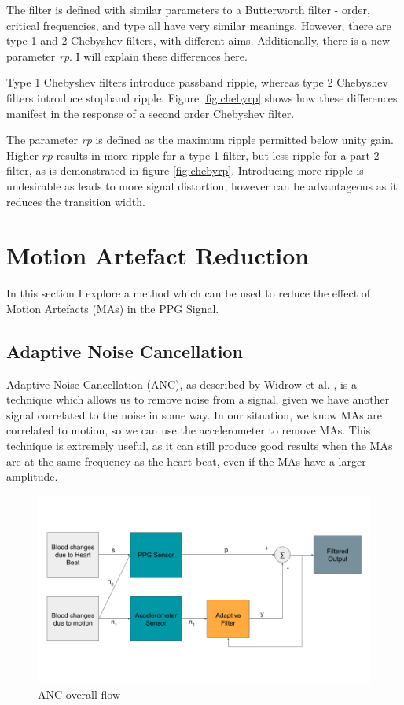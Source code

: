 \documentclass[12pt,a4paper,twoside,openright]{report}
\begin{document}
The filter is defined with similar parameters to a Butterworth filter - order,
critical frequencies, and type all have very similar meanings. However,
there are type 1 and 2 Chebyshev filters, with different aims. Additionally,
there is a new parameter \emph{rp}. I will explain these differences here.

Type 1 Chebyshev filters introduce passband ripple, whereas type 2 Chebyshev 
filters introduce stopband ripple. Figure \ref{fig:chebyrp} shows how these
differences manifest in the response of a second order Chebyshev filter.

The parameter \emph{rp} is defined as the maximum ripple permitted below unity
gain. Higher \(rp\) results in more ripple for a type 1 filter, but less
ripple for a part 2 filter, as is demonstrated in figure \ref{fig:chebyrp}.
Introducing more ripple is undesirable as leads to more signal distortion,
however can be advantageous as it reduces the transition width.

\section{Motion Artefact Reduction}

In this section I explore a method which can be used to reduce the effect of 
Motion Artefacts (MAs) in the PPG Signal.

\subsection{Adaptive Noise Cancellation}

Adaptive Noise Cancellation (ANC), as described by Widrow et al.
\cite{Widrow75}, is a technique which allows us to remove noise from a signal,
given we have another signal correlated to the noise in some way. In our 
situation, we know MAs are correlated to motion, so we can use the 
accelerometer to remove MAs. This technique is extremely useful, as it can 
still produce good results when the MAs are at the same frequency as the heart
beat, even if the MAs have a larger amplitude.



\begin{figure}[tbh]
	\centerline{\includegraphics[width=\textwidth]{figs/ANC-concept.png}}
\caption{ANC overall flow}
\label{epsfig}
\end{figure}
\end{document}

